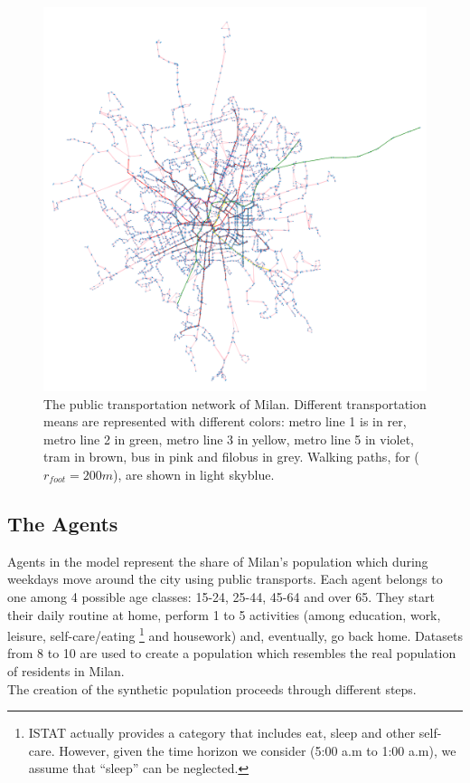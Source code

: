 \begin{figure}
    \centering
    \includegraphics[scale = 0.5]{tex/pics/network_complete_cut.png}
    \caption{The public transportation network of Milan. Different transportation means are represented with different colors: metro line 1 is in rer, metro line 2 in green, metro line 3 in yellow, metro line 5 in violet, tram in brown, bus in pink and filobus in grey. Walking paths, for ($r_{foot} = 200 m$), are shown in light skyblue.}
    \label{network_complete}
\end{figure}

 \subsection{The Agents}\label{sec3}
 
Agents in the model represent the share of Milan's population which during weekdays move around the city using public transports. Each agent belongs to one among 4 possible age classes: 15-24, 25-44, 45-64 and over 65. They start their daily routine at home, perform 1 to 5 activities (among education, work, leisure, self-care/eating \footnote{ISTAT actually provides a category that includes eat, sleep and other self-care. However, given the time horizon we consider (5:00 a.m  to 1:00 a.m), we assume that “sleep” can be neglected.} and housework) and, eventually, go back home. Datasets from 8 to 10 are used to create a population which resembles the real population of residents in Milan.  \\
The creation of the synthetic population proceeds through different steps.

